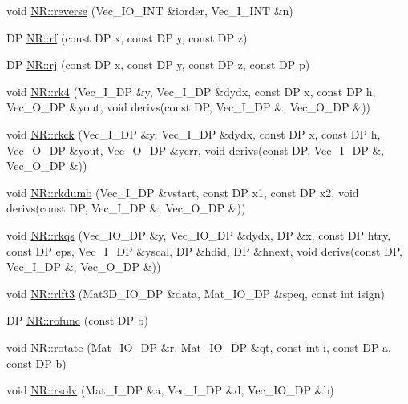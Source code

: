 \begin{DoxyCompactItemize}
\item 
void \mbox{\hyperlink{namespaceNR_a76ef747dae58b55d1fe6e2b48cd23af6}{N\+R\+::reverse}} (Vec\+\_\+\+I\+O\+\_\+\+I\+NT \&iorder, Vec\+\_\+\+I\+\_\+\+I\+NT \&n)
\item 
DP \mbox{\hyperlink{namespaceNR_a2559b510aaa0c283f2031537b9f23176}{N\+R\+::rf}} (const DP x, const DP y, const DP z)
\item 
DP \mbox{\hyperlink{namespaceNR_ac238786569e5bffe3268ad64d2a45636}{N\+R\+::rj}} (const DP x, const DP y, const DP z, const DP p)
\item 
void \mbox{\hyperlink{namespaceNR_a87093de020cebc6118dcf486f2030fbe}{N\+R\+::rk4}} (Vec\+\_\+\+I\+\_\+\+DP \&y, Vec\+\_\+\+I\+\_\+\+DP \&dydx, const DP x, const DP h, Vec\+\_\+\+O\+\_\+\+DP \&yout, void derivs(const DP, Vec\+\_\+\+I\+\_\+\+DP \&, Vec\+\_\+\+O\+\_\+\+DP \&))
\item 
void \mbox{\hyperlink{namespaceNR_a8fae33790a3dca7e757f1e7bf333b5ba}{N\+R\+::rkck}} (Vec\+\_\+\+I\+\_\+\+DP \&y, Vec\+\_\+\+I\+\_\+\+DP \&dydx, const DP x, const DP h, Vec\+\_\+\+O\+\_\+\+DP \&yout, Vec\+\_\+\+O\+\_\+\+DP \&yerr, void derivs(const DP, Vec\+\_\+\+I\+\_\+\+DP \&, Vec\+\_\+\+O\+\_\+\+DP \&))
\item 
void \mbox{\hyperlink{namespaceNR_a46a7b57fd403c001f40f08a0b71abc57}{N\+R\+::rkdumb}} (Vec\+\_\+\+I\+\_\+\+DP \&vstart, const DP x1, const DP x2, void derivs(const DP, Vec\+\_\+\+I\+\_\+\+DP \&, Vec\+\_\+\+O\+\_\+\+DP \&))
\item 
void \mbox{\hyperlink{namespaceNR_a07b7b00335709107b531436f32a7cdd8}{N\+R\+::rkqs}} (Vec\+\_\+\+I\+O\+\_\+\+DP \&y, Vec\+\_\+\+I\+O\+\_\+\+DP \&dydx, DP \&x, const DP htry, const DP eps, Vec\+\_\+\+I\+\_\+\+DP \&yscal, DP \&hdid, DP \&hnext, void derivs(const DP, Vec\+\_\+\+I\+\_\+\+DP \&, Vec\+\_\+\+O\+\_\+\+DP \&))
\item 
void \mbox{\hyperlink{namespaceNR_a7196d873664bc007122619a6c6ebe6f1}{N\+R\+::rlft3}} (Mat3\+D\+\_\+\+I\+O\+\_\+\+DP \&data, Mat\+\_\+\+I\+O\+\_\+\+DP \&speq, const int isign)
\item 
DP \mbox{\hyperlink{namespaceNR_a07be599c4e1af3eabb72f2f9c63f8033}{N\+R\+::rofunc}} (const DP b)
\item 
void \mbox{\hyperlink{namespaceNR_a0e1ecebfe787d1724c128b16d547c709}{N\+R\+::rotate}} (Mat\+\_\+\+I\+O\+\_\+\+DP \&r, Mat\+\_\+\+I\+O\+\_\+\+DP \&qt, const int i, const DP a, const DP b)
\item 
void \mbox{\hyperlink{namespaceNR_a5bcb5bccdabdf66243c940ae37016e07}{N\+R\+::rsolv}} (Mat\+\_\+\+I\+\_\+\+DP \&a, Vec\+\_\+\+I\+\_\+\+DP \&d, Vec\+\_\+\+I\+O\+\_\+\+DP \&b)

\end{DoxyCompactItemize}
